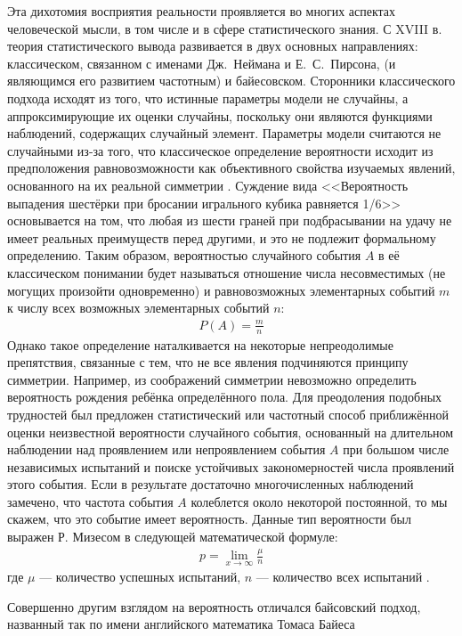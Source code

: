 Эта дихотомия восприятия реальности проявляется во многих аспектах человеческой мысли, в том числе и в сфере статистического знания. С XVIII в. теория статистического вывода развивается в двух основных направлениях: классическом, связанном с именами Дж.~Неймана и Е.~С.~Пирсона, (и являющимся его развитием частотным) и байесовском. Сторонники классического подхода исходят из того, что истинные параметры модели не случайны, а аппроксимирующие их оценки случайны, поскольку они являются функциями наблюдений, содержащих случайный элемент. \cite[стр. 5-6]{Zellner1980} Параметры модели считаются не случайными из-за того, что классическое определение вероятности исходит из предположения равновозможности как объективного свойства изучаемых явлений, основанного на их реальной симметрии \cite[стр. 24]{Gnedenko2005}. Суждение вида <<Вероятность выпадения шестёрки при бросании игрального кубика равняется 1/6>> основывается на том, что любая из шести граней при подбрасывании на удачу не имеет реальных преимуществ перед другими, и это не подлежит формальному определению. Таким образом, вероятностью случайного события $A$ в её классическом понимании будет называться отношение числа несовместимых (не могущих произойти одновременно) и равновозможных элементарных событий $m$ к числу всех возможных элементарных событий $n$:
\begin{eqnarray}
P(A)=\frac{m}{n}
\end{eqnarray}
Однако такое определение наталкивается на некоторые непреодолимые препятствия, связанные с тем, что не все явления подчиняются принципу симметрии. Например, из соображений симметрии невозможно определить вероятность рождения ребёнка определённого пола. Для преодоления подобных трудностей был предложен статистический или частотный способ приближённой оценки неизвестной вероятности случайного события, основанный на длительном наблюдении над проявлением или непроявлением события $A$ при большом числе независимых испытаний и поиске устойчивых закономерностей числа проявлений этого события. Если в результате достаточно многочисленных наблюдений замечено, что частота события $A$ колеблется около некоторой постоянной, то мы скажем, что это событие имеет вероятность. Данные тип вероятности был выражен Р. Мизесом в следующей математической формуле:
\begin{eqnarray}
p=\lim_{x\to\infty}\frac{\mu}{n}
\end{eqnarray}
где $\mu$ --- количество успешных испытаний, $n$ --- количество всех испытаний \cite[стр. 46-47]{Gnedenko2005}.

Совершенно другим взглядом на вероятность отличался байсовский подход, названный так по имени английского математика Томаса Байеса
\clearpage